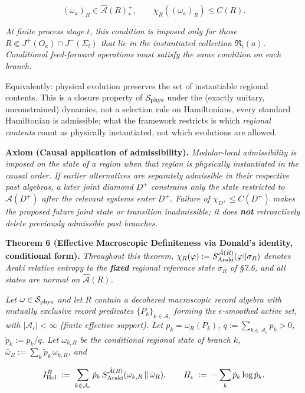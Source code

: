 \documentclass[11pt,a4paper]{article}
\begin{document}
\[
(\omega_a)_R \in \hat{\mathcal{A}}(R)_*^+, \qquad \chi_R((\omega_a)_R) \le C(R).
\]

\emph{At finite process stage $t$, this condition is imposed only for those $R \Subset J^+(O_a) \cap J^-(\Sigma_t)$ that lie in the instantiated collection $\mathfrak{R}_t(a)$. Conditional feed-forward operations must satisfy the same condition on each branch.}

Equivalently: physical evolution preserves the set of instantiable regional contents. This is a closure property of $\mathcal{S}_{\rm phys}$ under the (exactly unitary, unconstrained) dynamics, not a selection rule on Hamiltonians, every standard Hamiltonian is admissible; what the framework restricts is which \emph{regional contents} count as physically instantiated, not which evolutions are allowed.

\textbf{Axiom (Causal application of admissibility).} \emph{Modular-local admissibility is imposed on the state of a region when that region is physically instantiated in the causal order. If earlier alternatives are separately admissible in their respective past algebras, a later joint diamond $D^+$ constrains only the state restricted to $\hat{\mathcal{A}}(D^+)$ after the relevant systems enter $D^+$. Failure of $\chi_{D^+} \le C(D^+)$ makes the proposed future joint state or transition inadmissible; it does \textbf{not} retroactively delete previously admissible past branches.}

\textbf{Theorem 6 (Effective Macroscopic Definiteness via Donald's identity, conditional form).} \emph{Throughout this theorem, $\chi_R(\varphi) := S_{\rm Araki}^{\hat{\mathcal{A}}(R)}(\varphi \| \sigma_R)$ denotes Araki relative entropy to the \textbf{fixed} regional reference state $\sigma_R$ of §7.6, and all states are normal on $\hat{\mathcal{A}}(R)$.}

\emph{Let $\omega \in \mathcal{S}_{\rm phys}$ and let $R$ contain a decohered macroscopic record algebra with mutually exclusive record predicates $\{P_k\}_{k \in \mathcal{A}_\epsilon}$ forming the $\epsilon$-smoothed active set, with $|\mathcal{A}_\epsilon| < \infty$ (finite effective support). Let $p_k = \omega_R(P_k)$, $q := \sum_{k \in \mathcal{A}_\epsilon} p_k > 0$, $\tilde p_k := p_k/q$. Let $\omega_{k,R}$ be the conditional regional state of branch $k$, $\bar\omega_R := \sum_k \tilde p_k \, \omega_{k,R}$, and}

\[
I_{\rm Hol}^R \;:=\; \sum_{k \in \mathcal{A}_\epsilon} \tilde p_k \, S^{\hat{\mathcal{A}}(R)}_{\rm Araki}(\omega_{k,R} \,\|\, \bar\omega_R), \qquad H_\epsilon \;:=\; -\sum_k \tilde p_k \log \tilde p_k.
\]
\end{document}

